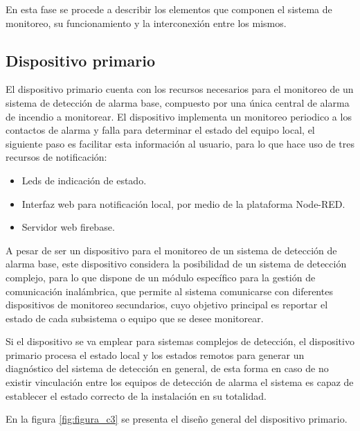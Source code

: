 En esta fase se procede a describir los elementos que componen el sistema de monitoreo, su funcionamiento y la interconexión entre los mismos.


\subsection{Dispositivo primario} 

El dispositivo primario cuenta con los recursos necesarios para el monitoreo de un sistema de detección de alarma base, compuesto por una única central de alarma de incendio a monitorear. El dispositivo implementa un monitoreo periodico a los contactos de alarma y falla para determinar el estado del equipo local, el siguiente paso es facilitar esta información al usuario, para lo que hace uso de tres recursos de notificación:
\begin{itemize}
\item Leds de indicación de estado.
\item Interfaz web para notificación local, por medio de la plataforma Node-RED.
\item Servidor web firebase.
\end{itemize}

A pesar de ser un dispositivo para el monitoreo de un sistema de detección de alarma base, este dispositivo considera la posibilidad de un sistema de detección complejo, para lo que dispone de un módulo específico para la gestión de comunicación inalámbrica, que permite al sistema comunicarse con diferentes dispositivos de monitoreo secundarios, cuyo objetivo principal es reportar el estado de cada subsistema o equipo que se desee monitorear.

Si el dispositivo se va emplear para sistemas complejos de detección, el dispositivo primario procesa el estado local y los estados remotos para generar un diagnóstico del sistema de detección en general, de esta forma en caso de no existir vinculación entre los equipos de detección de alarma el sistema es capaz de establecer el estado correcto de la instalación en su totalidad.

En la figura \ref{fig:figura_c3} se presenta el diseño general del dispositivo primario. 

